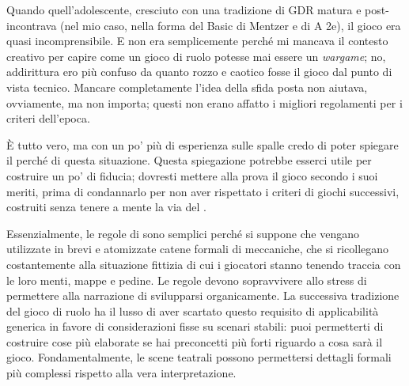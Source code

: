\begin{figure}[p!]
{
    }
\end{figure}

Quando quell'adolescente, cresciuto con una tradizione di GDR matura e post-\dnd{} incontrava \dnd{} (nel mio caso, nella forma del Basic di Mentzer e di A\dnd{} 2e), il gioco era quasi incomprensibile. E non era semplicemente perché mi mancava il contesto creativo per capire come un gioco di ruolo potesse mai essere un \textit{wargame}; no, addirittura ero più confuso da quanto rozzo e caotico fosse il gioco dal punto di vista tecnico. Mancare completamente l'idea della sfida posta non aiutava, ovviamente, ma non importa; questi non erano affatto i migliori regolamenti per i criteri dell'epoca.

È tutto vero, ma con un po' più di esperienza sulle spalle credo di poter spiegare il perché di questa situazione. Questa spiegazione potrebbe esserci utile per costruire un po' di fiducia; dovresti mettere alla prova il gioco secondo i suoi meriti, prima di condannarlo per non aver rispettato i criteri di giochi successivi, costruiti senza tenere a mente la via del .


Essenzialmente, le regole di \dnd{} sono semplici perché si suppone che vengano utilizzate in brevi e atomizzate catene formali di meccaniche, che si ricollegano costantemente alla situazione fittizia di cui i giocatori stanno tenendo traccia con le loro menti, mappe e pedine. Le regole devono sopravvivere allo stress di permettere alla narrazione di svilupparsi organicamente. La successiva tradizione del gioco di ruolo ha il lusso di aver scartato questo requisito di applicabilità generica in favore di considerazioni fisse su scenari stabili: puoi permetterti di costruire cose più elaborate se hai preconcetti più forti riguardo a cosa sarà il gioco. Fondamentalmente, le scene teatrali possono permettersi dettagli formali più complessi rispetto alla vera interpretazione.

